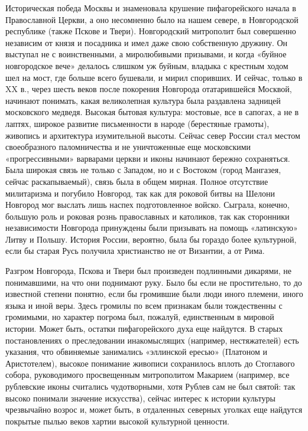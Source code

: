 Историческая победа Москвы и знаменовала крушение пифагорейского начала в
Православной Церкви, а оно несомненно было на нашем севере, в Новгородской
республике (также Пскове и Твери). Новгородский митрополит был совершенно
независим от князя и посадника и имел даже свою собственную дружину. Он
выступал не с воинственными, а миролюбивыми призывами, и когда «буйное
новгородское вече» делалось слишком уж буйным, владыка с крестным ходом шел на
мост, где больше всего бушевали, и мирил споривших. И сейчас, только в XX в.,
через шесть веков после покорения Новгорода отатарившейся Москвой, начинают
понимать, какая великолепная культура была раздавлена задницей московского
медведя. Высокая бытовая культура: мостовые, все в сапогах, а не в лаптях,
широкое развитие письменности в народе (берестяные грамоты), живопись и
архитектура изумительной высоты. Сейчас север России стал местом своеобразного
паломничества и не уничтоженные еще московскими «прогрессивными» варварами
церкви и иконы начинают бережно сохраняться. Была широкая связь не только с
Западом, но и с Востоком (город Мангазея, сейчас раскапываемый), связь была в
общем мирная. Полное отсутствие милитаризма и погубило Новгород, так как для
роковой битвы на Шелони Новгород мог выслать лишь наспех подготовленное войско.
Сыграла, конечно, большую роль и роковая рознь православных и
католиков, так как сторонники независимости Новгорода принуждены были призывать
на помощь «латинскую» Литву и Польшу. История России, вероятно, была бы гораздо
более культурной, если бы старая Русь получила христианство не от Византии, а
от Рима.

Разгром Новгорода, Пскова и Твери был произведен подлинными дикарями, не
понимавшими, на что они поднимают руку. Было бы если не простительно, то до
известной степени понятно, если бы громившие были люди иного племени, иного
языка и иной веры. Здесь громилы по всем признакам были тождественны с
громимыми, но характер погрома был, пожалуй, единственным в мировой истории.
Может быть, остатки пифагорейского духа еще найдутся. В старых постановлениях о
преследовании инакомыслящих (например, нестяжателей) есть указания, что
обвиняемые занимались «эллинской ересью» (Платоном и Аристотелем), высокое
понимание живописи сохранилось вплоть до Стоглавого собора, руководимого
просвещенным митрополитом Макарием (например, все рублевские иконы считались
чудотворными, хотя Рублев сам не был святой: так высоко понимали значение
искусства), сейчас интерес к истории культуры чрезвычайно возрос и, может быть,
в отдаленных северных уголках еще найдутся покрытые пылью веков хартии высокой
культурной ценности.

